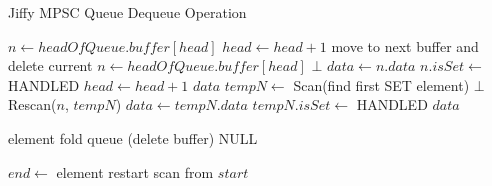 \begin{algorithm}[!ht]
    \centering
    \captionsetup{justification=centering}
    \caption{Jiffy \ac{MPSC} Queue Dequeue Operation \cite{jiffy}}
    \label{alg:jiffy-dequeue}
    \scriptsize
    \begin{algorithmic}[1]
            \State $n \gets headOfQueue.buffer[head]$
             
                \State $head \gets head + 1$
                    \State move to next buffer and delete current
                \EndIf
                \State $n \gets headOfQueue.buffer[head]$
            \EndWhile
                \State \Return $\bot$
            \EndIf
             
                \State $data \gets n.data$
                \State $n.isSet \gets$ HANDLED
                \State $head \gets head + 1$
                \State \Return $data$
            \EndIf
             
                \State $tempN \gets$ Scan(find first SET element)
                    \State \Return $\bot$
                \EndIf
                \State Rescan($n$, $tempN$) 
                \State $data \gets tempN.data$
                \State $tempN.isSet \gets$ HANDLED
                \State \Return $data$
            \EndIf
        \EndFunction
        
        \State
        
         
                    \State \Return element
                \EndIf
                    \State fold queue (delete buffer)
                \EndIf
            \EndFor
            \State \Return NULL
        \EndFunction
        
        \State
        
         
                    \State $end \gets$ element 
                    \State restart scan from $start$
                \EndIf
            \EndFor
        \EndFunction
    \end{algorithmic}
\end{algorithm}

